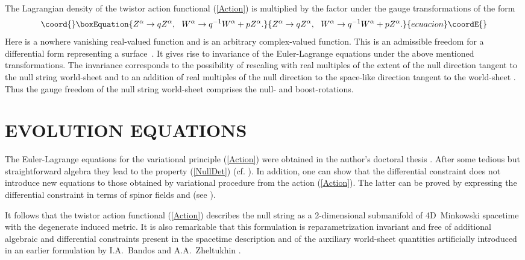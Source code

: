 \documentclass[a4paper,twocolumn,showkeys,showpacs,aps]{revtex4}
\begin{document}
The Lagrangian density of the twistor action functional
(\ref{Action}) is multiplied by the factor \coordHE{} under the gauge
transformations of the form
\begin{equation}\coord{}\boxEquation{
Z^\alpha \rightarrow qZ^\alpha ,\,\,\,\, W^\alpha \rightarrow
q^{-1}W^\alpha + pZ^\alpha .
}{
Z^\alpha \rightarrow qZ^\alpha ,\,\,\,\, W^\alpha \rightarrow
q^{-1}W^\alpha + pZ^\alpha .
}{ecuacion}\coordE{}\end{equation}
Here \coordHE{} is a nowhere vanishing real-valued function
and \coordHE{} is an arbitrary com\-plex-valued function.
This is an admissible freedom for a differential form representing
a surface~\cite{Schouten}. It gives rise to invariance of the
Euler-Lagrange equations under the above mentioned
transformations. The invariance corresponds to the possibility of
rescaling with real multiples of the extent of the null direction
tangent to the null string world-sheet \coordHE{} and to an addition of real multiples of the null
direction to the space-like direction tangent to the world-sheet
\coordHE{}. Thus
the gauge freedom of the null string world-sheet comprises the
null- and boost-rotations.

\section{EVOLUTION EQUATIONS}

The Euler-Lagrange equations for the variational principle
(\ref{Action}) were obtained in the author's doctoral thesis
\cite{Disser}. After some tedious but straightforward algebra they
lead to the property (\ref{NullDet}) (cf.
\cite{Gusev-Zheltukhin}). In addition, one can show that the
differential constraint does not introduce new equations to those
obtained by variational procedure from the action (\ref{Action}).
The latter can be proved by expressing the differential constraint
in terms of spinor fields \coordHE{} and  \coordHE{}
(see \cite{Disser}).

It follows that the twistor action functional (\ref{Action})
describes the null string as a 2-dimensional submanifold of
4D~Minkowski spacetime with the degenerate induced metric. It is
also remarkable that this formulation is reparametrization
invariant and free of additional algebraic and differential
constraints present in the spacetime description \cite{Stachel}
and of the auxiliary world-sheet quantities artificially
introduced in an earlier formulation by I.A.~Bandos and
A.A.~Zheltukhin \cite{Bandos-Zheltukhin2}.
\end{document}
